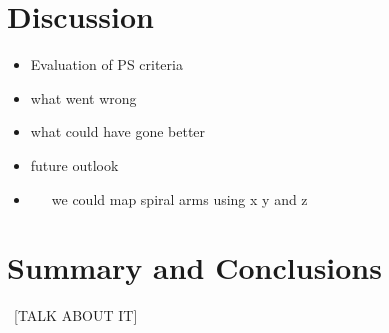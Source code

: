 \documentclass[aps,prl,twocolumn,superscriptaddress]{revtex4-1}
\begin{document}
\section{Discussion}
\begin{itemize}
	\item{} Evaluation of PS criteria
	\item{} what went wrong
	\item{} what could have gone better
	\item{} future outlook
	\item{}~~~we could map spiral arms using x y and z
\end{itemize}

	



\section{Summary and Conclusions}
~[TALK ABOUT IT]
\end{document}
